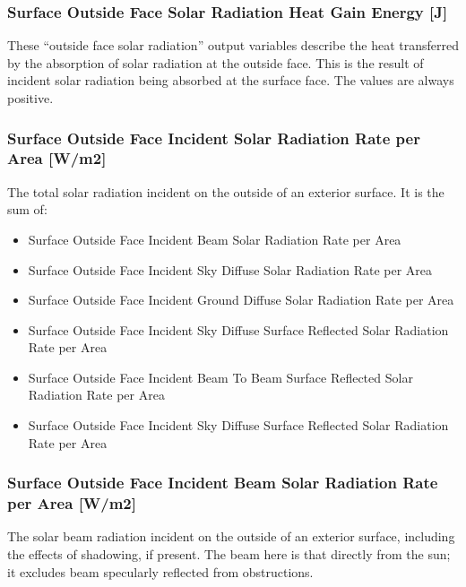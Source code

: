 \subsubsection{Surface Outside Face Solar Radiation Heat Gain Energy {[}J{]}}\label{surface-outside-face-solar-radiation-heat-gain-energy-j}

These ``outside face solar radiation'' output variables describe the heat transferred by the absorption of solar radiation at the outside face. This is the result of incident solar radiation being absorbed at the surface face. The values are always positive.

\subsubsection{Surface Outside Face Incident Solar Radiation Rate per Area {[}W/m2{]}}\label{surface-outside-face-incident-solar-radiation-rate-per-area-wm2}

The total solar radiation incident on the outside of an exterior surface. It is the sum of:

\begin{itemize}
\item
  Surface Outside Face Incident Beam Solar Radiation Rate per Area
\item
  Surface Outside Face Incident Sky Diffuse Solar Radiation Rate per Area
\item
  Surface Outside Face Incident Ground Diffuse Solar Radiation Rate per Area
\item
  Surface Outside Face Incident Sky Diffuse Surface Reflected Solar Radiation Rate per Area
\item
  Surface Outside Face Incident Beam To Beam Surface Reflected Solar Radiation Rate per Area
\item
  Surface Outside Face Incident Sky Diffuse Surface Reflected Solar Radiation Rate per Area
\end{itemize}

\subsubsection{Surface Outside Face Incident Beam Solar Radiation Rate per Area {[}W/m2{]}}\label{surface-outside-face-incident-beam-solar-radiation-rate-per-area-wm2}

The solar beam radiation incident on the outside of an exterior surface, including the effects of shadowing, if present. The beam here is that directly from the sun; it excludes beam specularly reflected from obstructions.

